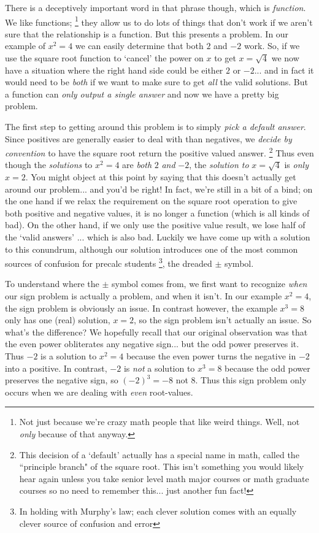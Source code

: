     There is a deceptively important word in that phrase though, which is \textit{function}. We like functions;%
    \footnote{Not just because we're crazy math people that like weird things. Well, not \textit{only} because of that anyway.}
    they allow us to do lots of things that don't work if we aren't sure that the relationship is a function. But this presents a problem. In our example of $x^2 = 4$ we can easily determine that both $2$ and $-2$ work. So, if we use the square root function to `cancel' the power on $x$ to get $x = \sqrt{4}$ we now have a situation where the right hand side could be either $2$ or $-2$... and in fact it would need to be \textit{both} if we want to make sure to get \textit{all} the valid solutions. But a function can \textit{only output a single answer} and now we have a pretty big problem.

    The first step to getting around this problem is to simply \textit{pick a default answer}. Since positives are generally easier to deal with than negatives, we \textit{decide by convention} to have the square root return the positive valued answer.%
    \footnote{This decision of a `default' actually has a special name in math, called the ``principle branch" of the square root. This isn't something you would likely hear again unless you take senior level math major courses or math graduate courses so no need to remember this... just another fun fact!}
    Thus even though the \textit{solutions} to $x^2 = 4$ are \textit{both} $2$ \textit{and} $-2$, the \textit{solution to} $x = \sqrt{4}$ is \textit{only} $x = 2$. You might object at this point by saying that this doesn't actually get around our problem... and you'd be right! In fact, we're still in a bit of a bind; on the one hand if we relax the requirement on the square root operation to give both positive and negative values, it is no longer a function (which is all kinds of bad). On the other hand, if we only use the positive value result, we lose half of the `valid answers' ... which is also bad. Luckily we have come up with a solution to this conundrum, although our solution introduces one of the most common sources of confusion for precalc students%
    \footnote{In holding with Murphy's law; each clever solution comes with an equally clever source of confusion and error},
    the dreaded $\pm$ symbol.

    To understand where the $\pm$ symbol comes from, we first want to recognize \textit{when} our sign problem is actually a problem, and when it isn't. In our example $x^2 = 4$, the sign problem is obviously an issue. In contrast however, the example $x^3 = 8$ only has one (real) solution, $x = 2$, so the sign problem isn't actually an issue. So what's the difference? We hopefully recall that our original observation was that the even power obliterates any negative sign... but the odd power preserves it. Thus $-2$ is a solution to $x^2 = 4$ because the even power turns the negative in $-2$ into a positive. In contrast, $-2$ is \textit{not} a solution to $x^3 = 8$ because the odd power preserves the negative sign, so $(-2)^3 = -8$ not $8$. Thus this sign problem only occurs when we are dealing with \textit{even} root-values.

